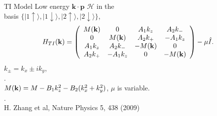 \documentclass[]{beamer}
\def\ket#1{\vert #1 \rangle}
\begin{document}

\begin{frame}{TI Model}
Low energy $\mathbf{k}\cdot \mathbf{p}$ $\mathcal{H} $ in the\\
basis $\{\ket{1\uparrow}, \ket{1\downarrow},\ket{2\uparrow},\ket{2\downarrow} \}$,
\begin{eqnarray*}
H_{TI}({\bf k})=
\left( \begin{array}{cccc}
M({\bf k}) & 0 & A_1 k_z  & A_2 k_{-} \\
0 &M({\bf k})& A_2 k_+ & -A_1 k_z \\
 A_1 k_z  & A_2 k_{-} &-M({\bf k}) & 0 \\
A_2 k_+ & -A_1 k_z &0 & -M({\bf k}) \\
 \end{array} \right)-\mu \hat{I}.
 \end{eqnarray*}
$k_{\pm}=k_x \pm i k_y $, \\.\\
$M({\bf k})=M-B_1 k_z ^2 - B_2 (k_x^2 + k_y^2)$, 
 $\mu$ is variable.\\. \\
H. Zhang et al, Nature Physics 5, 438 (2009)
\end{frame}
\end{document}
